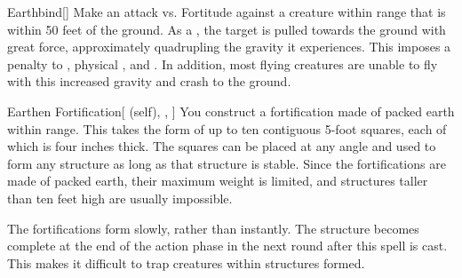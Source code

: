 \lowercase{\hypertarget{spell:Earthbind}{}}\label{spell:Earthbind}
\begin{apability}[\nth{2}]{\hypertarget{spell:Earthbind}{Earthbind}}[]
Make an attack vs. Fortitude against a creature within \rngmed range that is within 50 feet of the ground.
\hit As a , the target is pulled towards the ground with great force, approximately quadrupling the gravity it experiences.
This imposes a  penalty to , physical , and .
In addition, most flying creatures are unable to fly with this increased gravity and crash to the ground.
\end{apability}
\vspace{0.25em}



\lowercase{\hypertarget{spell:Earthen Fortification}{}}\label{spell:Earthen Fortification}
\begin{attuneability}[\nth{2}]{\hypertarget{spell:Earthen Fortification}{Earthen Fortification}}[ (self), , ]
You construct a fortification made of packed earth within \rngmed range.
This takes the form of up to ten contiguous 5-foot squares, each of which is four inches thick.
The squares can be placed at any angle and used to form any structure as long as that structure is stable.
Since the fortifications are made of packed earth, their maximum weight is limited, and structures taller than ten feet high are usually impossible.

The fortifications form slowly, rather than instantly.
The structure becomes complete at the end of the action phase in the next round after this spell is cast.
This makes it difficult to trap creatures within structures formed.
\end{attuneability}
\vspace{0.25em}



